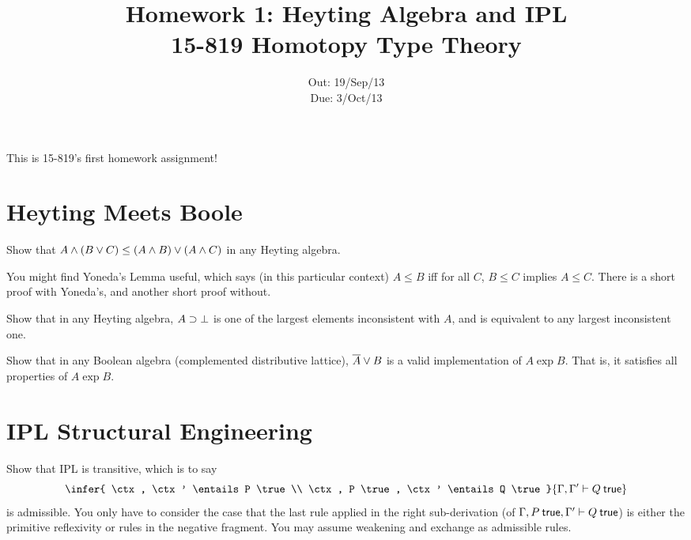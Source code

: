 \documentclass[12pt]{article}
\title{\Large\textbf{
  Homework 1: Heyting Algebra and IPL}
\normalsize\\
15-819 Homotopy Type Theory}
\author{}
\date{%
Out: 19/Sep/13\\
Due: 3/Oct/13
}
\begin{document}
\maketitle

This is 15-819's first homework assignment!

\section{Heyting Meets Boole}

\begin{task}
  Show that $A \wedge (B \vee C) \leq (A \wedge B) \vee (A \wedge C)$
  in any Heyting algebra.

  \begin{hint}
    You might find Yoneda's Lemma useful, which says (in this particular context)
    $A \leq B$ iff for all $C$, $B \leq C$ implies $A \leq C$.
    There is a short proof with Yoneda's, and another short proof without.
  \end{hint}
\end{task}

\begin{task}
  Show that in any Heyting algebra,
  $A \supset \bot$ is one of the largest elements inconsistent with $A$,
  and is equivalent to any largest inconsistent one.
\end{task}

\begin{task}
  Show that in any Boolean algebra (complemented distributive lattice),
  $\overline{A} \vee B$ is a valid implementation of $A \exp B$.
  That is, it satisfies all properties of $A \exp B$.
\end{task}

\section{IPL Structural Engineering}

\begin{task}
  Show that IPL is transitive, which is to say
  \[
    \infer{
      \ctx, \ctx' \entails P \true
      \\
      \ctx, P \true, \ctx' \entails Q \true
    }{
      \ctx, \ctx' \entails Q \true
    }
  \]
  is admissible.
  You only have to consider the case that the last rule applied in the right sub-derivation
  (of $\ctx, P \true, \ctx' \entails Q \true$)
  is either the primitive reflexivity or rules in the negative fragment.
  You may assume weakening and exchange as admissible rules.
\end{task}
\end{document}

